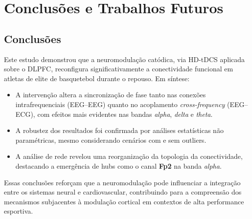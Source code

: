 \chapter{Conclusões e Trabalhos Futuros}
\label{chap:conclusoes_e_trabalhos_futuros}
\section{Conclusões}
Este estudo demonstrou que a neuromodulação catódica, via HD-tDCS aplicada sobre o DLPFC, reconfigura significativamente a conectividade funcional em atletas de elite de basquetebol durante o repouso. Em síntese:
\begin{itemize}
    \item A intervenção altera a sincronização de fase tanto nas conexões intrafrequenciais (EEG--EEG) quanto no acoplamento \textit{cross-frequency} (EEG--ECG), com efeitos mais evidentes nas bandas \emph{alpha}, \emph{delta} e \emph{theta}.
    \item A robustez dos resultados foi confirmada por análises estatísticas não paramétricas, mesmo considerando cenários com e sem outliers.
    \item A análise de rede revelou uma reorganização da topologia da conectividade, destacando a emergência de hubs como o canal \textbf{Fp2} na banda \emph{alpha}.
\end{itemize}
Essas conclusões reforçam que a neuromodulação pode influenciar a integração entre os sistemas neural e cardiovascular, contribuindo para a compreensão dos mecanismos subjacentes à modulação cortical em contextos de alta performance esportiva.

